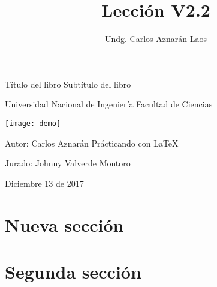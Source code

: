 \documentclass[10pt]{article}%
\author{Undg. Carlos Aznarán Laos}
\title{Lección V2.2}
\begin{document}
\maketitle



\begin{titlepage}
	\thispagestyle{empty} %
	\center
	\Huge{Título del libro}	\linebreak
	\Large{Subtítulo del libro}
	
	\vspace{5cm}
	
	\Large{Universidad Nacional de Ingeniería}	\linebreak
	\small{Facultad de Ciencias}
	
	\vspace{5mm}
	
	\texttt{[image: demo]}
	
	\vspace{5cm}
	
	\begin{minipage}{.4\textwidth}
		Autor: Carlos Aznarán
		\small{Prácticando con \LaTeX{}}
	\end{minipage}

	\hfill
	\begin{minipage}{.4\textwidth}
		\flushright
		Jurado: Johnny Valverde	\linebreak
		\small{Montoro}
	\end{minipage}

	\vspace{2cm}
	
	Diciembre 13 de 2017
\end{titlepage}

\pagestyle{fancy}
\section{Nueva sección}
\lipsum[1-10]
\section{Segunda sección}
\lipsum[5-10]
\end{document}
